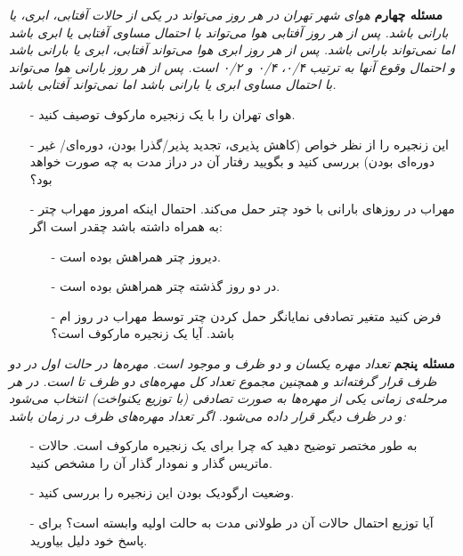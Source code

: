 \documentclass[12pt]{article}
\begin{document}
    \textbf{مسئله چهارم}
	\newline
	\textit{هوای شهر تهران در هر روز می‌تواند در یکی از حالات آفتابی، ابری، یا بارانی باشد. پس از هر روز آفتابی هوا می‌تواند با احتمال مساوی آفتابی یا ابری باشد اما نمی‌تواند بارانی باشد. پس از هر روز ابری هوا می‌تواند آفتابی، ابری یا بارانی باشد و احتمال وقوع آنها به ترتیب ۰/۴، ۰/۴ و ۰/۲ است. پس از هر روز بارانی هوا می‌تواند با احتمال مساوی ابری یا
بارانی باشد اما نمی‌تواند آفتابی باشد.}
    \begin{itemize}
	\item[-]
هوای تهران را با یک زنجیره مارکوف توصیف کنید.
	\item[-]	
	این زنجیره را از نظر خواص (کاهش پذیری، تجدید پذیر/گذرا بودن، دوره‌ای/ غیر دوره‌ای بودن) بررسی کنید و
بگویید رفتار آن در دراز مدت به چه صورت خواهد بود؟ 
	\item[-]	
مهراب در روزهای بارانی با خود چتر حمل می‌کند. احتمال اینکه امروز مهراب چتر به همراه داشته باشد چقدر
است اگر: 
    \begin{itemize}
	\item[-]
دیروز چتر همراهش بوده است.
	\item[-]	
	 در دو روز گذشته چتر همراهش بوده است.
	 \item[-]	
	 فرض کنید متغیر تصادفی  نمایانگر حمل کردن چتر توسط مهراب در روز  ام باشد. آیا  یک زنجیره
مارکوف است؟ 
    \end{itemize}
    \end{itemize}
    \bigskip

    \textbf{مسئله پنجم}
	\newline
	\textit{تعداد  مهره یکسان و دو ظرف  و  موجود است. مهره‌ها در حالت اول در دو ظرف قرار گرفته‌اند و همچنین مجموع تعداد کل مهره‌های دو ظرف  تا است. در هر مرحله‌ی زمانی یکی از مهره‌ها به صورت تصادفی (با توزیع یکنواخت)
انتخاب می‌شود و در ظرف دیگر قرار داده می‌شود.
اگر  تعداد مهره‌های ظرف  در زمان  باشد:
}
    \begin{itemize}
	\item[-]
به طور مختصر توضیح دهید که چرا  برای  یک زنجیره مارکوف است. حالات ماتریس گذار و نمودار
گذار آن را مشخص کنید.
	\item[-]	
وضعیت ارگودیک بودن این زنجیره را بررسی کنید.
	\item[-]	
آیا توزیع احتمال حالات آن در طولانی مدت به حالت اولیه وابسته است؟ برای پاسخ خود دلیل بیاورید.
    \end{itemize}
    \bigskip    
    
\end{document}
